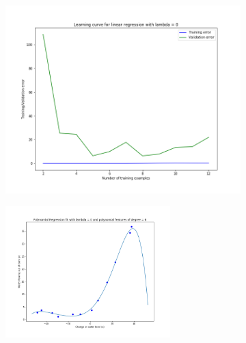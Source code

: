 \documentclass[english,11pt]{article}
\begin{document}
\begin{figure}[H]
\centering
\begin{subfigure}{.5\textwidth}
\centering
\includegraphics[width=.7\linewidth]{../hw1/part2/fig3_2_A4_Learning_curve_lambda_0.png}
\end{subfigure}%
\begin{subfigure}{.5\textwidth}
\centering
\includegraphics[width=0.7\textwidth]{../hw1/part2/fig3_2_A4_polynomial_fit_lambda_0.png}
\end{subfigure}


\end{figure}
\end{document}
